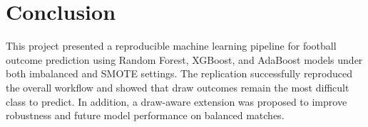 \documentclass[11pt]{article}
\begin{document}
\section{Conclusion}

This project presented a reproducible machine learning pipeline for football outcome prediction using Random Forest, XGBoost, and AdaBoost models under both imbalanced and SMOTE settings. The replication successfully reproduced the overall workflow and showed that draw outcomes remain the most difficult class to predict. In addition, a draw-aware extension was proposed to improve robustness and future model performance on balanced matches.


\nocite{*}

\end{document}
